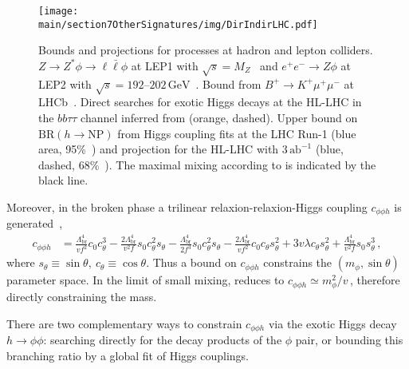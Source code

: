   \begin{figure}[t!]
 \begin{center}
  \texttt{[image: \\main/section7OtherSignatures/img/DirIndirLHC.pdf]}
    \caption{ Bounds and projections for processes at hadron and
    lepton colliders.  $Z\to Z^*\phi\to \ell\bar \ell \phi$ at LEP1 with
    $\sqrt{s}=M_Z$~\cite{Acciarri:1996um} and $e^+e^-\to Z\phi$ at LEP2 with
    $\sqrt{s}=192$--$202\,\textrm{GeV}$~\cite{Schael:2006cr}. 
    Bound from $B^+\to K^+ \mu^+ \mu^-$ at LHCb~\cite{Aaij:2012vr,Aaij:2015tna}. 
    Direct searches for exotic Higgs decays at the HL-LHC in
    the $bb\tau\tau$ channel inferred from  (orange, dashed).
    Upper bound on $\textrm{BR}(h\to\textrm{NP})$ from Higgs coupling fits at the LHC Run-1 (blue area, 95\%~\cl) and projection for the HL-LHC with $3\,\textrm{ab} ^{-1}$ (blue, dashed, 68\%~\cl). 
    The maximal mixing
    according to  is indicated by the black line.  }
  \label{fig:DirIndirHLLHC}
 \end{center}
\end{figure} 

Moreover, in the broken phase a trilinear relaxion-relaxion-Higgs coupling $c_{\phi\phi h}$ is
generated~\cite{Flacke:2016szy,Frugiuele:2018coc},
\begin{align}
 c_{\phi\phi h} &= \frac{\Lambda_{\textrm{br} }^4}{v f^2} c_0 c_{\theta}^3
 - \frac{2 \Lambda_{\textrm{br} }^4  }{v^2 f} s_0 c_{\theta}^2 s_{\theta}
- \frac{\Lambda_{\textrm{br} }^4}{2f^3} s_0 c_{\theta}^2 s_{\theta}
- \frac{2\Lambda_{\textrm{br} }^4}{v f^2} c_0 c_{\theta} s_{\theta}^2
+ 3v \lambda c_{\theta} s_{\theta}^2
                  + \frac{\Lambda_{\textrm{br} }^4 }{v^2 f} s_0 s_{\theta}^3\,,
                  \label{eq:phiphih}
\end{align}
where $s_\theta\equiv \sin\theta,~c_\theta\equiv \cos\theta$.
Thus a bound on $c_{\phi\phi h}$ constrains the $(m_\phi,\sin\theta)$ parameter space.
In the limit of small mixing,  reduces to
$ c_{\phi\phi h}  \simeq m_{\phi}^2/v$\,,
therefore directly constraining the mass. 

There are two complementary ways to constrain $c_{\phi\phi h}$ via the exotic Higgs decay $h\to\phi\phi$: searching directly for the decay products of the $\phi$ pair, or bounding this branching ratio by a global fit of Higgs couplings.
 
